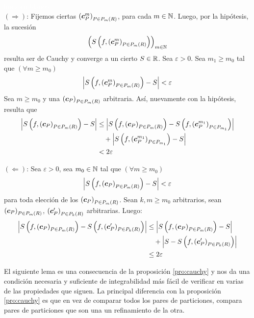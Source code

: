 \begin{demostracion}
\textcolor{white}{linea en blanco}
\\$(\Rightarrow)$: Fijemos ciertas \familiasEleccion{} ${(\boldsymbol{c}^m_P)}_{P \in P_{m}(R)} $, para cada $m\in \mathbb{N}$. Luego, por la hip\'otesis, la sucesi\'on $${\left(S\left(f,{(\boldsymbol{c}^m_P)}_{P \in P_{m}(R)}\right)\right)}_{m\in \mathbb{N}}$$ resulta ser de Cauchy y converge a un cierto $ S \in \mathbb{R} $. Sea $ \varepsilon> 0 $. Sea $ m_1 \geq m_0 $ tal que $ (\forall m \geq m_0) $
\[ \left\lvert S\left(f,{(\boldsymbol{c}^m_P)}_{P \in P_{m}(R)}\right) - S \right\rvert < \varepsilon\]
Sea $ m \geq m_0 $ y una \familiaEleccion{} $ {(\boldsymbol{c}_P)}_{P \in P_{m}(R)} $ arbitraria. As\'i, nuevamente con la hip\'otesis, resulta que
\begin{align*}
\left\lvert S\left(f, {(\boldsymbol{c}_P)}_{P \in P_{m}(R)}\right) - S \right\rvert
    &\leq \left\lvert S\left(f, {(\boldsymbol{c}_P)}_{P \in P_{m}(R)}\right) -
        S\left(f,{(\boldsymbol{c}^{m_1}_P)}_{P \in P_{m_1}}\right) \right\rvert \\
    &\quad + \left\lvert S\left(f,{(\boldsymbol{c}^{m_1}_P)}_{P \in P_{m_1}}\right) - S \right\rvert \\
    &< 2 \varepsilon
\end{align*}

\smallskip

$(\Leftarrow)$: Sea $ \varepsilon > 0 $, sea $m_0\in\mathbb{N}$ tal que $(\forall m \geq m_0)$
\[ \left\lvert S\left(f, {(\boldsymbol{c}_P)}_{P \in P_{m}(R)}\right) - S \right\rvert < \varepsilon \]
para toda elecci\'on de los $ {(\boldsymbol{c}_P)}_{P \in P_{m}(R)} $. Sean $ k,m \geq m_0 $ arbitrarios, sean $ {(\boldsymbol{c}_P)}_{P \in P_{m}(R)}$, ${(\boldsymbol{c}'_P)}_{P \in P_{k}(R)} $ \familiasEleccion{} arbitrarias.
Luego:
\begin{align*}
\left\lvert S\left(f,{(\boldsymbol{c}_P)}_{P \in P_{m}(R)}\right) - S\left(f,{(\boldsymbol{c}'_P)}_{P \in
P_{k}(R)}\right)\right\rvert
    &\leq \left\lvert S\left(f,{(\boldsymbol{c}_P)}_{P \in P_{m}(R)}\right) - S\right\rvert \\
    &\quad + \left\lvert S - S\left(f,{(\boldsymbol{c}'_P)}_{P \in P_{k}(R)}\right) \right\rvert \\
    &\leq 2 \varepsilon
\end{align*}
\end{demostracion}

El siguiente lema es una consecuencia de la proposici\'on \ref{pro:cauchy} y nos da una condici\'on necesaria y suficiente de integrabilidad m\'as f\'acil de verificar en varias de las propiedades que siguen. La principal diferencia con la proposici\'on \ref{pro:cauchy} es que en vez de comparar todos los pares de particiones, compara pares de particiones que son una un refinamiento de la otra.

